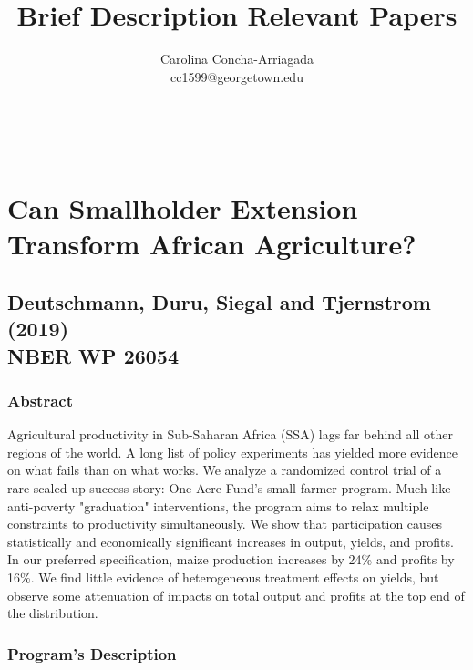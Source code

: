 \documentclass[12pt,letterpaper]{article}
\makeatletter
\renewcommand{\maketitle}{\bgroup
   \begin{center}
   \textbf{{\fontsize{10pt}{12}\selectfont \@title}}\\
   \vspace{8pt}
   {\fontsize{10pt}{0}\selectfont \@author} 
   \end{center}
}
\makeatother
\begin{document}
\title{Brief Description Relevant Papers}
\author{Carolina Concha-Arriagada \\ cc1599@georgetown.edu}

\maketitle
\thispagestyle{fancy}


\section{Can Smallholder Extension Transform African Agriculture?}
\subsection*{Deutschmann, Duru, Siegal and Tjernstrom (2019) \\ NBER WP 26054}

\subsubsection*{Abstract} 
\noindent Agricultural productivity in Sub-Saharan Africa (SSA) lags far behind all other regions of the world. A long list of policy experiments has yielded more evidence on what fails than on what works. We analyze a randomized control trial of a rare scaled-up success story: One Acre Fund’s small farmer program. Much like anti-poverty "graduation" interventions, the program aims to relax multiple constraints to productivity simultaneously. We show that participation causes statistically and economically significant increases in output, yields, and profits. In our preferred specification, maize production increases by 24\% and profits by 16\%. We find little evidence of heterogeneous treatment effects on yields, but observe some attenuation of impacts on total output and profits at the top end of the distribution.

\subsubsection*{Program's Description}
\end{document}
